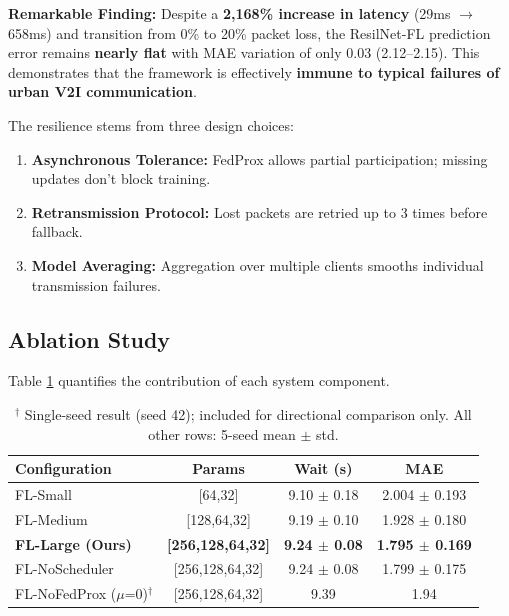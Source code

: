 \documentclass[conference]{IEEEtran}
\begin{document}
\textbf{Remarkable Finding:} Despite a \textbf{2,168\% increase in latency} (29ms $\rightarrow$ 658ms) and transition from 0\% to 20\% packet loss, the ResilNet-FL prediction error remains \textbf{nearly flat} with MAE variation of only 0.03 (2.12--2.15). This demonstrates that the framework is effectively \textbf{immune to typical failures of urban V2I communication}.

The resilience stems from three design choices:
\begin{enumerate}
    \item \textbf{Asynchronous Tolerance:} FedProx allows partial participation; missing updates don't block training.
    \item \textbf{Retransmission Protocol:} Lost packets are retried up to 3 times before fallback.
    \item \textbf{Model Averaging:} Aggregation over multiple clients smooths individual transmission failures.
\end{enumerate}

\subsection{Ablation Study}
Table \ref{tab:ablation} quantifies the contribution of each system component.

\begin{table}[htbp]
\caption{Ablation Study Results (mean $\pm$ std, 5 independent seeds). Error bars make the statistical significance of each design choice explicit.}
\label{tab:ablation}
\centering
\begin{tabular}{lccc}
\toprule
\textbf{Configuration} & \textbf{Params} & \textbf{Wait (s)} & \textbf{MAE} \\
\midrule
FL-Small        & [64,32]           & 9.10 $\pm$ 0.18 & 2.004 $\pm$ 0.193 \\
FL-Medium       & [128,64,32]       & 9.19 $\pm$ 0.10 & 1.928 $\pm$ 0.180 \\
\textbf{FL-Large (Ours)} & \textbf{[256,128,64,32]} & \textbf{9.24 $\pm$ 0.08} & \textbf{1.795 $\pm$ 0.169} \\
FL-NoScheduler  & [256,128,64,32]   & 9.24 $\pm$ 0.08 & 1.799 $\pm$ 0.175 \\
FL-NoFedProx ($\mu$=0)$^\dagger$ & [256,128,64,32] & 9.39 & 1.94 \\
\bottomrule
\end{tabular}
\vspace{1mm}
\caption*{\footnotesize $^\dagger$ Single-seed result (seed 42); included for directional comparison only. All other rows: 5-seed mean $\pm$ std.}
\end{table}
\end{document}
